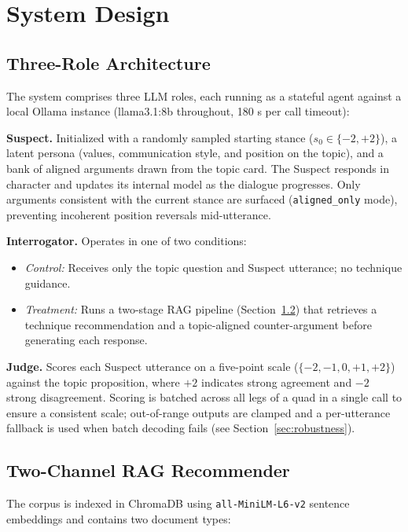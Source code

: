 \documentclass[sigconf]{acmart}
\begin{document}
\section{System Design}

\subsection{Three-Role Architecture}
The system comprises three LLM roles, each running as a stateful agent against
a local Ollama instance (llama3.1:8b throughout, 180 s per call timeout):

\textbf{Suspect.} Initialized with a randomly sampled starting stance
($s_0 \in \{-2, +2\}$), a latent persona (values, communication style, and
position on the topic), and a bank of aligned arguments drawn from the topic
card. The Suspect responds in character and updates its internal model as the
dialogue progresses. Only arguments consistent with the current stance are
surfaced (\texttt{aligned\_only} mode), preventing incoherent position reversals
mid-utterance.

\textbf{Interrogator.} Operates in one of two conditions:
\begin{itemize}
  \item \emph{Control:} Receives only the topic question and Suspect utterance;
    no technique guidance.
  \item \emph{Treatment:} Runs a two-stage RAG pipeline (Section~\ref{sec:rag})
    that retrieves a technique recommendation and a topic-aligned counter-argument
    before generating each response.
\end{itemize}

\textbf{Judge.} Scores each Suspect utterance on a five-point scale
($\{-2,-1,0,+1,+2\}$) against the topic proposition, where $+2$ indicates
strong agreement and $-2$ strong disagreement. Scoring is batched across all
legs of a quad in a single call to ensure a consistent scale; out-of-range
outputs are clamped and a per-utterance fallback is used when batch decoding
fails (see Section~\ref{sec:robustness}).

\subsection{Two-Channel RAG Recommender}
\label{sec:rag}

The corpus is indexed in ChromaDB using \texttt{all-MiniLM-L6-v2} sentence
embeddings and contains two document types:
\end{document}
